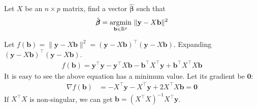     \begin{Ex} \label{12 - 1}
        Let $X$ be an $n\times p$ matrix, find a vector $\hat{\pmb{\beta}}$ such that
        \begin{equation*}
            \hat{\pmb{\beta}} = \underset{\mathbf{b}\in \mathbb{R}^p}{\operatorname*{arg\!\min}} \ \lVert \mathbf{y} - X\mathbf{b} \rVert^2
        \end{equation*}
        \begin{sol}
        Let $f(\mathbf{b}) = \lVert \mathbf{y} - X\mathbf{b} \rVert^2 = (\mathbf{y} - X\mathbf{b})^{\top}(\mathbf{y} - X\mathbf{b})$. Expanding $(\mathbf{y} - X\mathbf{b})^{\top}(\mathbf{y} - X\mathbf{b})$.
            \begin{align*}
                f(\mathbf{b}) = \mathbf{y}^{\top}\mathbf{y} - \mathbf{y}^{\top} X \mathbf{b} - \mathbf{b}^\top X^{\top}\mathbf{y} + \mathbf{b}^\top X^{\top} X\mathbf{b}
            \end{align*}
            It is easy to see the above equation has a minimum value. Let its gradient be $\mathbf{0}$:
            \begin{align*}
                \nabla f(\mathbf{b}) &= -X^{\top}\mathbf{y} - X^{\top}\mathbf{y} + 2X^{\top}X \mathbf{b} = \mathbf{0}
            \end{align*}
            If $X^{\top}X$ is non-singular, we can get $\mathbf{b} = (X^{\top}X)^{-1}X^{\top} \mathbf{y}$.
        \end{sol}
    \end{Ex}

